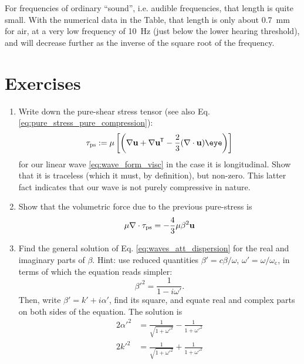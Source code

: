 For frequencies of ordinary ``sound'', i.e. audible frequencies, that
length is quite small. With the numerical data in the Table, that
length is only about \SI{0.7}{\milli\meter} for air, at a very low
frequency of \SI{10}{\hertz} (just below the lower hearing threshold),
and will decrease further as the inverse of the square root of the
frequency.



\section{Exercises}
\begin{enumerate}

\item \label{ex:shear_in_wave} Write down the pure-shear stress tensor
  (see also Eq. \ref{eq:pure_stress_pure_compression}):
  \[
    \tau_\mathrm{ps} :=
    \mu  \left[
      \left(
        \nabla\bfu + \nabla\bfu\tran  - \frac23 (\divu)  \eye
      \right)
    \right] 
  \]
  for our linear wave \ref{eq:wave_form_visc} in the case it is
  longitudinal. Show that it is traceless (which it must, by
  definition), but non-zero. This latter fact indicates that our wave
  is not purely compressive in nature.
 
\item \label{ex:div_of_traceless} Show that the volumetric force due
  to the previous pure-stress is
  \[
   \mu \nabla \cdot  \tau_\mathrm{ps}  = -\frac43 \mu \beta^2 \mathbf{u}
  \]

\item \label{ex:sound_att} Find the general solution of
  Eq. \ref{eq:waves_att_dispersion} for the real and imaginary parts
  of $\beta$. Hint: use reduced quantities $\beta'= c\beta/\omega $,
  $\omega'=\omega/\omega_\mathrm{c}$, in terms of which the equation
  reads simpler:
  \[
    \beta'^2 = \frac{1}{1-i \omega'} .
  \]
  Then, write $\beta'=k'+i \alpha'$, find its square, and equate real
  and complex parts on both sides of the equation.  The solution is
  \begin{align*}
    2\alpha'^2 &=\frac {1}{\sqrt{1+\omega'^{2}}} - \frac {1}{1+\omega'^{2}} \\
    2k'^2     &=\frac {1}{\sqrt{1+\omega'^{2}}} + \frac {1}{1+\omega'^{2}}
  \end{align*}

  
\end{enumerate}